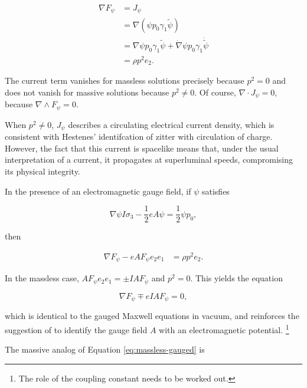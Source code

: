 \documentclass{article}
\begin{document}
    \begin{align}
      \nabla F_\psi &= J_\psi\\
      &= \nabla (\psi p_0 \gamma_1 \widetilde \psi)\\
      &= \nabla \psi p_0 \gamma_1 \widetilde \psi + \dot \nabla \psi p_0 \gamma_1 \dot{\widetilde \psi} \\
      &= \rho p^2 e_2.
    \end{align}

    The current term vanishes for massless solutions precisely because $p^2 = 0$ and does not vanish for massive solutions because $p^2 \not= 0$. Of course, $\nabla \cdot J_\psi = 0$, because $\nabla \wedge F_\psi = 0$.

    When $p^2 \not= 0$, $J_\psi$ describes a circulating electrical current density, which is consistent with Hestenes' identifcation of zitter with circulation of charge. However, the fact that this current is spacelike means that, under the usual interpretation of a current, it propagates at superluminal speeds, compromising its physical integrity.

    In the presence of an electromagnetic gauge field, if $\psi$ satisfies

    \begin{equation}
      \nabla \psi I \sigma_3 - \frac{1}{2} e A \psi = \frac{1}{2} \psi p_0,
    \end{equation}

    then

    \begin{align}
      \nabla F_\psi - e A F_\psi e_2 e_1
      &= \rho p^2 e_2.\label{eq:gaugedem}
    \end{align}

    In the massless case, $A F_\psi e_2 e_1 = \pm I A F_\psi$ and $p^2 = 0$. This yields the equation 

    \begin{equation}
      \nabla F_\psi \mp e I A F_\psi = 0,\label{eq:massless-gauged}
    \end{equation}

    which is identical to the gauged Maxwell equations in vacuum,\cite{duality}\cite{malik}\cite{tiwari} and reinforces the suggestion of \cite{duality} to identify the gauge field $A$ with an electromagnetic potential. \footnote{The role of the coupling constant needs to be worked out.}

    The massive analog of Equation \ref{eq:massless-gauged} is \cite{duality} \cite{tiwari}
\end{document}
